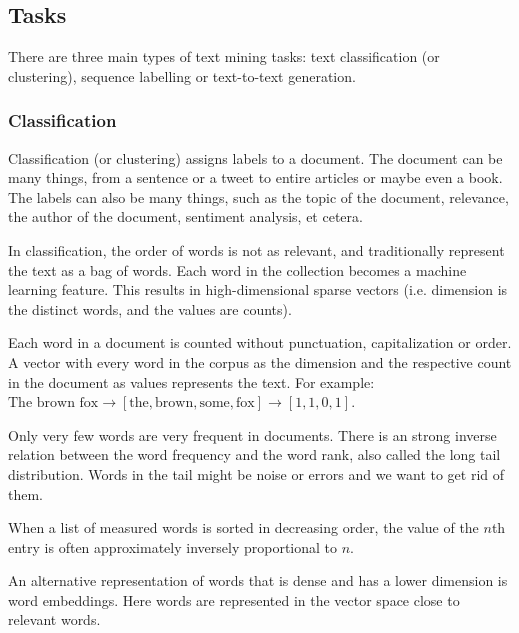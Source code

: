 \subsection{Tasks}

There are three main types of text mining tasks:
text classification (or clustering), sequence labelling or
text-to-text generation.

\subsubsection{Classification}

Classification (or clustering) assigns labels to a document. The document can be
many things, from a sentence or a tweet to entire articles or maybe even a book.
The labels can also be many things, such as the topic of the
document, relevance,
the author of the document, sentiment analysis, et cetera.

In classification, the order of words is not as relevant, and
traditionally represent
the text as a bag of words. Each word in the collection becomes a
machine learning feature.
This results in high-dimensional sparse vectors (i.e. dimension is
  the distinct words, and
the values are counts).

\begin{definition}
  Each word in a document is counted without punctuation,
  capitalization or order. A vector
  with every word in the corpus as the dimension and the respective
  count in the document as
  values represents the text. For example: $\text{The brown fox}
  \rightarrow [\text{the}, \text{brown}, \text{some}, \text{fox}] \rightarrow
  [1, 1, 0, 1]$.
\end{definition}

Only very few words are very frequent in documents. There is an strong inverse
relation between the word frequency and the word rank, also called the long tail
distribution. Words in the tail might be noise or errors and we want to get rid
of them.

\begin{definition}
  When a list of measured words is sorted in decreasing order, the
  value of the $n$th entry is often approximately inversely proportional to $n$.
\end{definition}

An alternative representation of words that is dense and has a lower
dimension is
word embeddings. Here words are represented in the vector space close
to relevant words.

